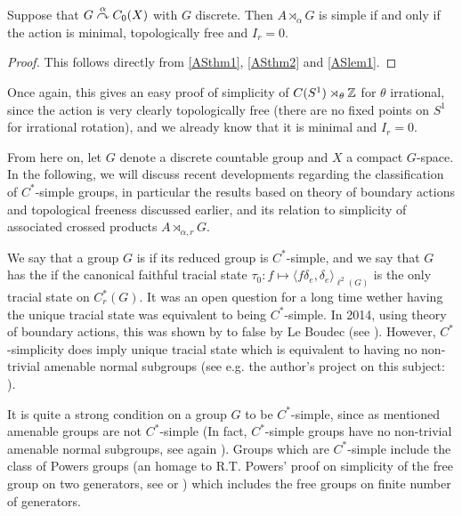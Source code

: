 \begin{corollary}
	Suppose that $G \stackrel{\alpha}{\curvearrowright} C_0(X)$ with $G$ discrete. Then $A \rtimes_\alpha G$ is simple if and only if the action is minimal, topologically free and $I_r = 0$.
\end{corollary}
\begin{proof}
	This follows directly from \cref{ASthm1}, \cref{ASthm2} and \cref{ASlem1}.
\end{proof}
Once again, this gives an easy proof of simplicity of $C(S^1) \rtimes_{\theta} \mathbb{Z}$ for $\theta$ irrational, since the action is very clearly topologically free (there are no fixed points on $S^1$ for irrational rotation), and we already know that it is minimal and $I_r = 0$.

From here on, let $G$ denote a discrete countable group and $X$ a compact $G$-space. In the following, we will discuss recent developments regarding the classification of $C^*$-simple groups, in particular the results based on theory of boundary actions and topological freeness discussed earlier, and its relation to simplicity of associated crossed products $A \rtimes_{\alpha,r} G$. 

We say that a group $G$ is  if its reduced group is $C^*$-simple, and we say that $G$ has the  if the canonical faithful tracial state $\tau_0 \colon f \mapsto \langle f\delta_e  , \delta_e\rangle_{\ell^2(G)}$ is the only tracial state on $C_r^*(G)$. It was an open question for a long time wether having the unique tracial state was equivalent to being $C^*$-simple. In 2014, using theory of boundary actions, this was shown by to false by Le Boudec (see \cite[Thoerem A]{le2017c}). However, $C^*$-simplicity does imply unique tracial state which is equivalent to having no non-trivial amenable normal subgroups (see e.g. the author's project on this subject: \cite[Chapter 5]{bscp}).

It is quite a strong condition on a group $G$ to be $C^*$-simple, since as mentioned amenable groups are not $C^*$-simple (In fact, $C^*$-simple groups have no non-trivial amenable normal subgroups, see again \cite[Chapter 5]{bscp}). Groups which are $C^*$-simple include the class of Powers groups (an homage to R.T. Powers' proof on simplicity of the free group on two generators, see \cite{powers1975simplicity} or \cite[chapter 3]{bscp}) which includes the free groups on finite number of generators.

